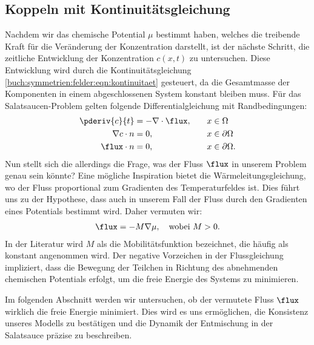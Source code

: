 \subsection{Koppeln mit Kontinuitätsgleichung}
Nachdem wir das chemische Potential $\mu$ bestimmt haben,
welches die treibende Kraft für die Veränderung der Konzentration darstellt,
ist der nächste Schritt,
die zeitliche Entwicklung der Konzentration $c(x,t)$ zu untersuchen.
Diese Entwicklung wird durch die Kontinuitätsgleichung
\eqref{buch:symmetrien:felder:eqn:kontinuitaet} gesteuert,
da die Gesamtmasse der Komponenten in einem abgeschlossenen System konstant bleiben muss.
Für das Salatsaucen-Problem gelten folgende Differentialgleichung mit Randbedingungen:
\begin{align}
\begin{aligned}
\pderiv{c}{t}
&=
- \nabla \cdot \flux
,\quad&
x &\in \Omega
\\
\nabla c \cdot n
&=
0
,&
x &\in \partial\Omega
\\
\flux \cdot n
&=
0
,&
x &\in \partial\Omega
.
\end{aligned}
\label{cahnhilliard:continuity}
\end{align}
Nun stellt sich die allerdings die Frage,
was der Fluss $\flux$ in unserem Problem genau sein könnte?
Eine mögliche Inspiration bietet die Wärmeleitungsgleichung,
wo der Fluss proportional zum Gradienten des Temperaturfeldes ist.
Dies führt uns zu der Hypothese, dass auch in unserem Fall der Fluss
durch den Gradienten eines Potentials bestimmt wird.
Daher vermuten wir:
\begin{align*}
\flux
=
- M \nabla \mu
,\quad\text{wobei } M > 0
.
\end{align*}
In der Literatur wird $M$ als die Mobilitätsfunktion bezeichnet,
die häufig als konstant angenommen wird.
Der negative Vorzeichen in der Flussgleichung impliziert,
dass die Bewegung der Teilchen in Richtung des abnehmenden chemischen Potentials erfolgt,
um die freie Energie des Systems zu minimieren.

Im folgenden Abschnitt werden wir untersuchen,
ob der vermutete Fluss $\flux$ wirklich die freie Energie minimiert.
Dies wird es uns ermöglichen,
die Konsistenz unseres Modells zu bestätigen und
die Dynamik der Entmischung in der Salatsauce präzise zu beschreiben.

